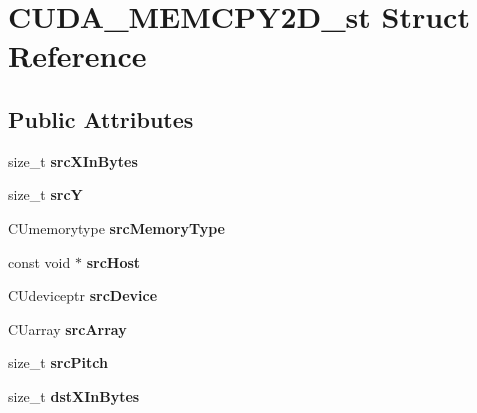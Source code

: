 \hypertarget{structCUDA__MEMCPY2D__st}{}\section{C\+U\+D\+A\+\_\+\+M\+E\+M\+C\+P\+Y2\+D\+\_\+st Struct Reference}
\label{structCUDA__MEMCPY2D__st}
\subsection*{Public Attributes}
\begin{DoxyCompactItemize}
\item 
size\+\_\+t {\bfseries src\+X\+In\+Bytes}\hypertarget{structCUDA__MEMCPY2D__st_af0021eedea67d779f4dc1df226cb27b6}{}\label{structCUDA__MEMCPY2D__st_af0021eedea67d779f4dc1df226cb27b6}

\item 
size\+\_\+t {\bfseries srcY}\hypertarget{structCUDA__MEMCPY2D__st_a620be67748ad30084f249e26bb58d789}{}\label{structCUDA__MEMCPY2D__st_a620be67748ad30084f249e26bb58d789}

\item 
C\+Umemorytype {\bfseries src\+Memory\+Type}\hypertarget{structCUDA__MEMCPY2D__st_a9c8cbec0f85f10d7653f24b79d7b76cd}{}\label{structCUDA__MEMCPY2D__st_a9c8cbec0f85f10d7653f24b79d7b76cd}

\item 
const void $\ast$ {\bfseries src\+Host}\hypertarget{structCUDA__MEMCPY2D__st_a63b7951046622ab6bf0f40cef9688849}{}\label{structCUDA__MEMCPY2D__st_a63b7951046622ab6bf0f40cef9688849}

\item 
C\+Udeviceptr {\bfseries src\+Device}\hypertarget{structCUDA__MEMCPY2D__st_a5016184b936eb67144cce5a0987d67da}{}\label{structCUDA__MEMCPY2D__st_a5016184b936eb67144cce5a0987d67da}

\item 
C\+Uarray {\bfseries src\+Array}\hypertarget{structCUDA__MEMCPY2D__st_ada88028619eb81028088fe9bb02d7e1d}{}\label{structCUDA__MEMCPY2D__st_ada88028619eb81028088fe9bb02d7e1d}

\item 
size\+\_\+t {\bfseries src\+Pitch}\hypertarget{structCUDA__MEMCPY2D__st_aeef0b0a539bee2c6286fe2b6d7fd0604}{}\label{structCUDA__MEMCPY2D__st_aeef0b0a539bee2c6286fe2b6d7fd0604}

\item 
size\+\_\+t {\bfseries dst\+X\+In\+Bytes}\hypertarget{structCUDA__MEMCPY2D__st_a1d3de3ad7ec8bce0eecc24ec5860e03f}{}\label{structCUDA__MEMCPY2D__st_a1d3de3ad7ec8bce0eecc24ec5860e03f}


\end{DoxyCompactItemize}
